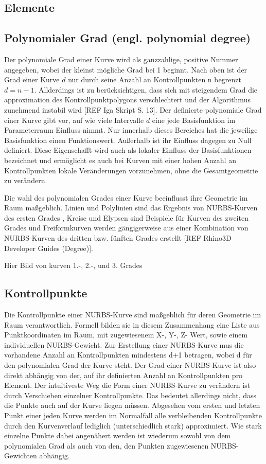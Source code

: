 \documentclass[german,a4paper,12pt,oneside]{scrbook}
\theoremstyle{definition}
\theoremstyle{definition}
\theoremstyle{definition}
\theoremstyle{definition}
\theoremstyle{definition}
\theoremstyle{definition}
\begin{document}
\subsection{Elemente}

\subsection{Polynomialer Grad (engl. polynomial degree)}
Der polynomiale Grad einer Kurve wird als ganzzahlige, positive Nummer angegeben, wobei der kleinst mögliche Grad bei 1 beginnt. Nach oben ist der Grad einer Kurve $d$ nur durch seine Anzahl an Kontrollpunkten n begrenzt $d = n - 1$. Allderdings ist zu berücksichtigen, dass sich mit steigendem Grad die approximation des Kontrollpunktpolygons verschlechtert und der Algorithmus zunehmend instabil wird [REF Iga Skript S. 13]. Der definierte polynomiale Grad einer Kurve gibt vor, auf wie viele Intervalle $d$ eine jede Basisfunktion im Parameterraum Einfluss nimmt. Nur innerhalb dieses Bereiches hat die jeweilige Basisfunktion einen Funktionswert. Außerhalb ist ihr Einfluss dagegen zu Null definiert. Diese Eigenschafft wird auch als lokaler Einfluss der Basisfunktionen bezeichnet und ermöglicht es auch bei Kurven mit einer hohen Anzahl an Kontrollpunkten lokale Veränderungen vorzunehmen, ohne die Gesamtgeometrie zu verändern.

Die wahl des polynomialen Grades einer Kurve beeinflusst ihre Geometrie im Raum maßgeblich. Linien und Polylinien sind das Ergebnis von NURBS-Kurven des ersten Grades , Kreise und Elypsen sind Beispiele für Kurven des zweiten Grades und Freiformkurven werden gängigerweise aus einer Kombination von NURBS-Kurven des dritten bzw. fünften Grades erstellt [REF Rhino3D Developer Guides (Degree)].

\large
\vspace{1.5cm}
\hfil
Hier Bild von kurven 1.-, 2.-, und 3. Grades

\normalsize
\subsection{Kontrollpunkte}
Die Kontrollpunkte einer NURBS-Kurve sind maßgeblich für deren Geometrie im Raum verantwortlich. Formell bilden sie in diesem Zusammenhang eine Liste aus Punktkoordinaten im Raum, mit zugewiesenem X-, Y-, Z- Wert, sowie einem individuellen NURBS-Gewicht. Zur Erstellung einer NURBS-Kurve mus die vorhandene Anzahl an Kontrollpunkten mindestens d+1 betragen, wobei d für den polynomialen Grad der Kurve steht. Der Grad einer NURBS-Kurve ist also direkt abhängig von der, auf ihr definierten Anzahl an Kontrollpunkten pro Element. Der intuitiveste Weg die Form einer NURBS-Kurve zu verändern ist durch Verschieben einzelner Kontrollpunkte. Das bedeutet allerdings nicht, dass die Punkte auch auf der Kurve liegen müssen. Abgesehen vom ersten und letzten Punkt einer jeden Kurve werden im Normalfall alle verbleibenden Kontrollpunkte durch den Kurvenverlauf lediglich (unterschiedlich stark) approximiert. Wie stark einzelne Punkte dabei angenähert werden ist wiederum sowohl von dem polynomialen Grad als auch von den, den Punkten zugewiesenen NURBS-Gewichten abhängig.
\end{document}
